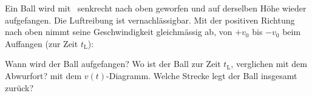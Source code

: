 Ein Ball wird mit \vNullO\ senkrecht nach oben geworfen und auf derselben Höhe wieder aufgefangen. Die Luftreibung ist vernachlässigbar. Mit der positiven Richtung nach oben nimmt seine Geschwindigkeit gleichmässig ab, von $+v_0$ bis $-v_0$ beim Auffangen (zur Zeit $t_\mathrm{L}$):
\begin{center}
\end{center}
\begin{abcliste}
\abc Wann wird der Ball aufgefangen?
\abc Wo ist der Ball zur Zeit $t_\mathrm{L}$, verglichen mit dem Abwurfort?  mit dem $v(t)$-Diagramm.
\abc Welche Strecke legt der Ball insgesamt zurück?
\end{abcliste}
